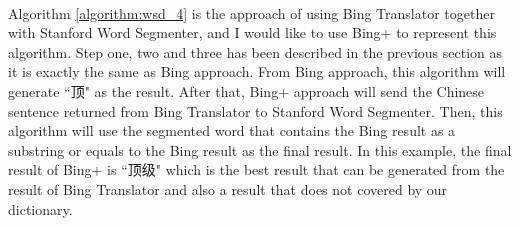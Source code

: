 \\
Algorithm \ref{algorithm:wsd_4} is the approach of using Bing Translator together with Stanford Word Segmenter, and I would like to use Bing+ to represent this algorithm. Step one, two and three has been described in the previous section as it is exactly the same as Bing approach. From Bing approach, this algorithm will generate ``顶" as the result. After that, Bing+ approach will send the Chinese sentence returned from Bing Translator to Stanford Word Segmenter. Then, this algorithm will use the segmented word that contains the Bing result as a substring or equals to the Bing result as the final result. In this example, the final result of Bing+ is ``顶级" which is the best result that can be generated from the result of Bing Translator and also a result that does not covered by our dictionary.
\\
